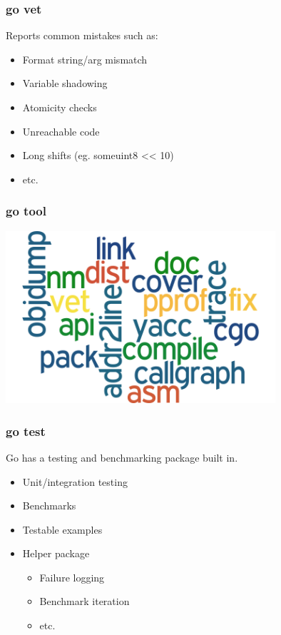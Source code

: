 \documentclass[xelatex,aspectratio=169]{beamer}
\begin{document}
\begin{frame}
	\frametitle{go vet}
	\begin{flushleft}
		Reports common mistakes such as:
	\end{flushleft}
	\begin{itemize}[<+(1)->]
		\item Format string/arg mismatch
		\item Variable shadowing
		\item Atomicity checks
		\item Unreachable code
		\item Long shifts (eg. someuint8 << 10)
		\item etc.
	\end{itemize}
\end{frame}

\begin{frame}
\frametitle{go tool}
\centerline{\includegraphics[width=0.75\textwidth]{images/tools.png}}
\end{frame}

\begin{frame}
	\frametitle{go test}
	\begin{flushleft}
		Go has a testing and benchmarking package built in.
	\end{flushleft}
	\begin{flushleft}
	\begin{itemize}[<+(1)->]
			\item Unit/integration testing
			\item Benchmarks
			\item Testable examples
			\item Helper package
			\begin{itemize}[<+(1)->]
				\item Failure logging
				\item Benchmark iteration
				\item etc.
			\end{itemize}
	\end{itemize}
	\end{flushleft}
\end{frame}
\end{document}
